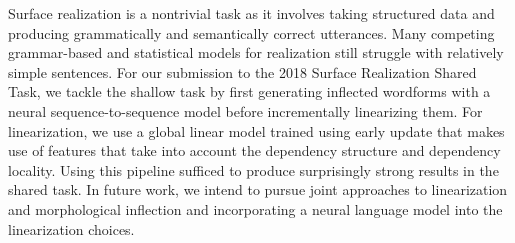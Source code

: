 Surface realization is a nontrivial task as it involves taking structured data and producing grammatically and semantically correct utterances.  Many competing grammar-based and statistical models for realization still struggle with relatively simple sentences.  For our submission to the 2018 Surface Realization Shared Task, we tackle the shallow task by first generating inflected wordforms with a neural sequence-to-sequence model before incrementally linearizing them. For linearization, we use a global linear model trained using early update that makes use of features that take into account the dependency structure and dependency locality.  Using this pipeline sufficed to produce surprisingly strong results in the shared task.  In future work, we intend to pursue joint approaches to linearization and morphological inflection and incorporating a neural language model into the linearization choices.
